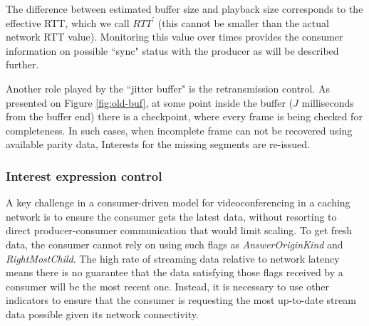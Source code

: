 \documentclass{icn/sig-alternate-2012} %
\begin{document}
The difference between estimated buffer size and playback size corresponds to the effective RTT, which we call $RTT^{\prime}$ (this cannot be smaller than the actual network RTT value). %
Monitoring this value over times provides the consumer information on possible ``sync" status with the producer as will be described further. %

Another role played by the ``jitter buffer" is the retransmission control. As presented on Figure \ref{fig:old-buf}, at some point inside the buffer ($J$ milliseconds from the buffer end) there is a checkpoint, where every frame is being checked for completeness. In such cases, when incomplete frame can not be recovered using available parity data, Interests for the missing segments are re-issued.

\subsubsection{Interest expression control}



A key challenge in a consumer-driven model for videoconferencing in a caching network is to ensure the consumer gets the latest data, without resorting to direct producer-consumer communication that would limit scaling. To get fresh data, the consumer cannot rely on using such flags as \textit{AnswerOriginKind} and \textit{RightMostChild}. The high rate of streaming data relative to network latency means there is no guarantee that the data satisfying those flags received by a consumer will be the most recent one. Instead, it is necessary to use other indicators to ensure that the consumer is requesting the most up-to-date stream data possible given its network connectivity. 
\end{document}
